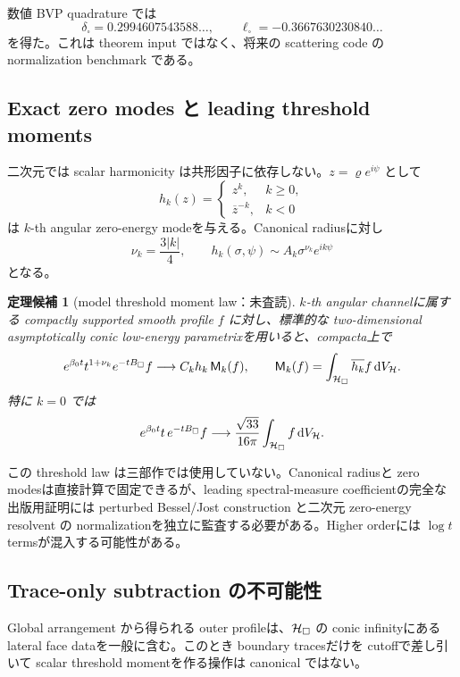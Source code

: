 \documentclass[11pt,a4paper]{ltjsarticle}
\theoremstyle{plain}
\newtheorem{theorem}[conjecture]{定理候補}
\theoremstyle{definition}
\theoremstyle{remark}
\begin{document}
数値 BVP quadrature では
\[
 \delta_\square=0.2994607543588\ldots,
 \qquad
 \ell_\square=-0.3667630230840\ldots
\]
を得た。これは theorem input ではなく、将来の scattering code の normalization benchmark である。

\subsection{Exact zero modes と leading threshold moments}

二次元では scalar harmonicity は共形因子に依存しない。$z=\varrho e^{i\psi}$ として
\[
 h_k(z)=
 \begin{cases}
 z^k,&k\ge0,\\
 \overline z^{-k},&k<0
 \end{cases}
\]
は $k$-th angular zero-energy modeを与える。Canonical radiusに対し
\[
 \nu_k=\frac{3|k|}{4},
 \qquad
 h_k(\sigma,\psi)
 \sim A_k\sigma^{\nu_k}e^{ik\psi}
\]
となる。

\begin{theorem}[model threshold moment law：未査読]\label{thm:model-threshold-v22}
$k$-th angular channelに属する compactly supported smooth profile $f$ に対し、標準的な two-dimensional asymptotically conic low-energy parametrixを用いると、compacta上で
\[
 e^{\beta_0t}t^{1+\nu_k}e^{-tB_\square}f
 \longrightarrow
 C_k h_k\,\mathsf M_k(f),
 \qquad
 \mathsf M_k(f)=\int_{\mathcal H_\square}\overline{h_k}f\,\mathrm d V_{\mathcal H}.
\]
特に $k=0$ では
\[
 e^{\beta_0t}t\,e^{-tB_\square}f
 \longrightarrow
 \frac{\sqrt{33}}{16\pi}
 \int_{\mathcal H_\square}f\,\mathrm d V_{\mathcal H}.
\]
\end{theorem}

\begin{warningbox}
この threshold law は三部作では使用していない。Canonical radiusと zero modesは直接計算で固定できるが、leading spectral-measure coefficientの完全な出版用証明には perturbed Bessel/Jost construction と二次元 zero-energy resolvent の normalizationを独立に監査する必要がある。Higher orderには $\log t$ termsが混入する可能性がある。
\end{warningbox}

\subsection{Trace-only subtraction の不可能性}

Global arrangement から得られる outer profileは、$\mathcal H_\square$ の conic infinityにある lateral face dataを一般に含む。このとき boundary tracesだけを cutoffで差し引いて scalar threshold momentを作る操作は canonical ではない。
\end{document}

